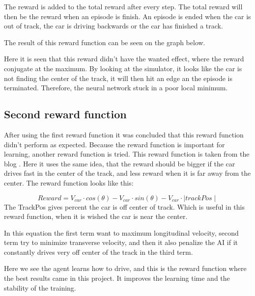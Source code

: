 The reward is added to the total reward after every step. The total reward will then be the reward when an episode is finish. An episode is ended when the car is out of track, the car is driving backwards or the car has finished a track. 

The result of this reward function can be seen on the graph below. 

Here it is seen that this reward didn't have the wanted effect, where the reward conjugate at the maximum. By looking at the simulator, it looks like the car is not finding the center of the track, it will then hit an edge an the episode is terminated. Therefore, the neural network stuck in a poor local minimum.  

\subsection*{Second reward function}
After using the first reward function it was concluded that this reward function didn't perform as expected. Because the reward function is important for learning, another reward function is tried. This reward function is taken from the blog \cite{DDPG_Torcs}. Here it uses the same idea, that the reward should be bigger if the car drives fast in the center of the track, and less reward when it is far away from the center. The reward function looks like this:

\begin{equation}
Reward = V_{car} \cdot cos(\theta) - V_{car} \cdot sin(\theta) - V_{car} \cdot \mid trackPos\mid 
\end{equation}
The TrackPos gives percent the car is off center of track. Which is useful in this reward function, when it is wished the car is near the center.  

In this equation the first term want to maximum longitudinal velocity, second term try to minimize transverse velocity, and then it also penalize the AI if it constantly drives very off center of the track in the third term.

Here we see the agent learns how to drive, and this is the reward function where the best results came in this project. It improves the learning time and the stability of the training. 